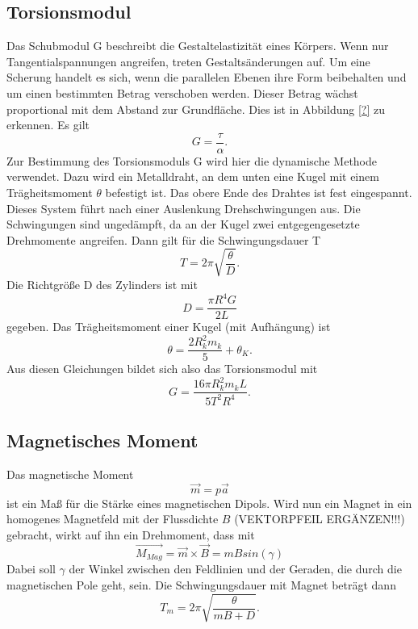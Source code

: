 \documentclass[11pt,ngerman,a4paper]{article}
\begin{document}
\subsection{Torsionsmodul}
Das Schubmodul G beschreibt die Gestaltelastizität eines Körpers. Wenn nur Tangentialspannungen angreifen, treten Gestaltsänderungen auf. Um eine Scherung handelt es sich, wenn die parallelen Ebenen ihre Form beibehalten und um einen bestimmten Betrag verschoben werden. Dieser Betrag wächst proportional mit dem Abstand zur Grundfläche. Dies ist in Abbildung \ref{?} zu erkennen.
Es gilt
\begin{equation}
\label{4}
G = \frac{\tau}{\alpha}.
\end{equation}
Zur Bestimmung des Torsionsmoduls G wird hier die dynamische Methode verwendet. Dazu wird ein Metalldraht, an dem unten eine Kugel mit einem Trägheitsmoment $\theta$ befestigt ist. Das obere Ende des Drahtes ist fest eingespannt. Dieses System führt nach einer Auslenkung Drehschwingungen aus. Die Schwingungen sind ungedämpft, da an der Kugel zwei entgegengesetzte Drehmomente angreifen.
Dann gilt für die Schwingungsdauer T
\begin{equation}
\label{5}
T=2\pi \sqrt{\frac{\theta}{D}}.
\end{equation}
Die Richtgröße D des Zylinders ist mit
\begin{equation}
\label{6}
D=\frac{\pi  R^4 G}{2L}
\end{equation}
gegeben. Das Trägheitsmoment einer Kugel (mit Aufhängung) ist
\begin{equation}
\label{7}
\theta=\frac{2R_k^2m_k}{5}+\theta_K.
\end{equation}
Aus diesen Gleichungen bildet sich also das Torsionsmodul mit
\begin{equation}
\label{8}
G=\frac{16\pi R_k^2m_kL}{5T^2R^4}.
\end{equation}
\subsection{Magnetisches Moment}
Das magnetische Moment
\begin{equation}
\label{9}
\vec{m}=p\vec{a} 
\end{equation}
ist ein Maß für die Stärke eines magnetischen Dipols. Wird nun ein Magnet in ein homogenes Magnetfeld mit der Flussdichte $B$ (VEKTORPFEIL ERGÄNZEN!!!) gebracht, wirkt auf ihn ein Drehmoment, dass mit
\begin{equation}
\label{10}
\vec{M_{Mag}}=\vec{m} \times \vec{B} = m B sin(\gamma)
\end{equation}
Dabei soll $\gamma$ der Winkel zwischen den Feldlinien und der Geraden, die durch die magnetischen Pole geht, sein.
Die Schwingungsdauer mit Magnet beträgt dann
\begin{equation}
\label{11}
T_m=2\pi \sqrt{\frac{\theta}{mB+D}}.
\end{equation}
\end{document}
